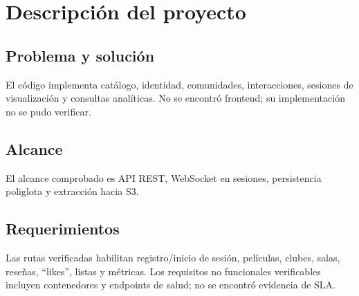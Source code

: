 \chapter{Descripción del proyecto}\section{Problema y solución}El código implementa catálogo, identidad, comunidades, interacciones, sesiones de visualización y consultas analíticas. No se encontró frontend; su implementación no se pudo verificar.\section{Alcance}El alcance comprobado es API REST, WebSocket en sesiones, persistencia poliglota y extracción hacia S3.\section{Requerimientos}Las rutas verificadas habilitan registro/inicio de sesión, películas, clubes, salas, reseñas, ``likes'', listas y métricas. Los requisitos no funcionales verificables incluyen contenedores y endpoints de salud; no se encontró evidencia de SLA.
